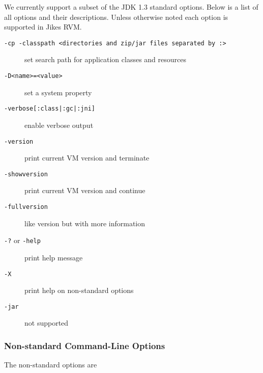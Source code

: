 We currently support a subset of the JDK 1.3 standard options.  Below
is a list of all options and their descriptions.  Unless otherwise noted each
option is supported in Jikes RVM.
\begin{description}
\item[{\tt -cp -classpath <directories and zip/jar files separated by :>}]
set search path for application classes and resources

\item[{\tt -D<name>=<value>}] set a system property

\item[{\tt -verbose[:class|:gc|:jni]}]
enable verbose output

\item[{\tt -version}] print current VM version and terminate

\item[{\tt -showversion}] print current VM version and continue

\item[{\tt -fullversion}] like version but with more information

\item[{\tt -?} or {\tt -help}] print help message

\item[{\tt -X}] print help on non-standard options

\item[{\tt -jar}] not supported

\end{description}

\subsubsection{Non-standard Command-Line Options}

The non-standard options are

